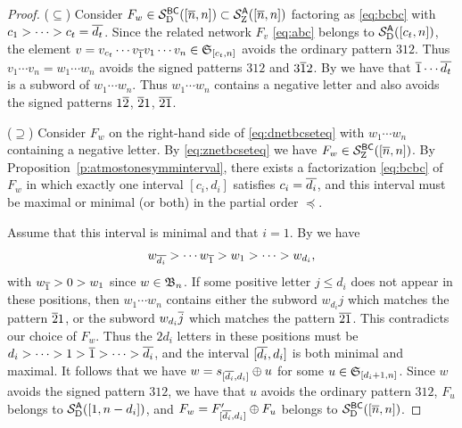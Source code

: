 \documentclass[11pt]{article}
\theoremstyle{definition}
\numberwithin{equation}{section}
\begin{document}
\begin{proof}
  ($\subseteq$)
  Consider
  $F_w \in \mathcal S^{\mathsf{BC}}_{\mathrm D}([\overline{n}, n]) \subset \mathcal S^{\mathsf{A}}_{\mathrm Z}([\overline{n}, n])$
  factoring as
  \eqref{eq:bcbc}
  with $c_1 > \cdots > c_t = \overline{d_t}$.
  Since the related network $F_v$ \eqref{eq:abc}
  belongs to
  $\mathcal S^{\mathsf{A}}_{\mathrm D}([c_t, n])$,
  the element $v = v_{c_t} \cdots v_{\overline{1}} v_1 \cdots v_n \in \mathfrak{S}_{[c_t,n]}$
  avoids the ordinary pattern $312$.
  Thus $v_1 \cdots v_n = w_1 \cdots w_n$
  avoids the signed patterns $312$ and $3 \overline{1} 2$.
  By \cite[Obs.\,3.2]{SkanNNDCB}
  we have that
  $\overline{1} \cdots \overline{d_t}$ is a subword of $w_1 \cdots w_n$.
  Thus $w_1 \cdots w_n$ contains a negative letter and also
  avoids the signed patterns $1 \overline{2}$, $\overline{2}1$, $\overline{2}\overline{1}$. 
  
  ($\supseteq$) Consider $F_w$ on the right-hand side of
  \eqref{eq:dnetbcseteq} with $w_1 \cdots w_n$ containing a negative
  letter.
  By \eqref{eq:znetbcseteq}
  we have
  $F_w \in \mathcal S^{\mathsf{BC}}_{\mathrm Z}([\overline{n},n])$.
  By Proposition~\ref{p:atmostonesymminterval},
  there exists a factorization
  \eqref{eq:bcbc} of $F_w$
  in which exactly one interval $[c_i,d_i]$ satisfies $c_i = \overline{d_i}$,
  and this interval must be maximal or minimal (or both)
  in the partial order $\preceq$.

  Assume that this interval is minimal and that $i = 1$.
  By \cite[Obs.\,3.2]{SkanNNDCB}
  we have
  \begin{equation}\label{eq:decseq}
    w_{\ol{d_i}} > \cdots w_{\ol1} > w_1 > \cdots > w_{d_i},
  \end{equation}
  with $w_{\overline{1}} > 0 > w_1$ since $w \in \mathfrak{B}_n$.
  If some positive letter $j \leq d_i$ does not appear in these positions,
  then $w_1 \cdots w_n$ contains either
  the subword $w_{d_i} j$ which matches the pattern $\overline{2}1$,
  or the subword $w_{d_i} \overline{j}$ which matches the pattern $\overline{2}\overline{1}$.
  This contradicts our choice of $F_w$.
  Thus
  the $2d_i$ letters in these positions
  must be
  $d_i > \cdots > 1 > \overline{1} > \cdots > \overline{d_i}$,
  and the interval $[\overline{d_i},d_i]$ is both minimal and maximal.
  It follows that we have $w = s_{[\overline{d_i},d_i]} \oplus u$ for some
  $u \in \mathfrak{S}_{[d_i+1,n]}$.
  Since $w$ avoids the signed pattern $312$, we have that
  $u$ avoids the ordinary pattern $312$,
  $F_u$ belongs to $\mathcal S^{\mathsf{A}}_{\mathrm D}([1,n-d_i])$,
  and $F_w = F'_{[\overline{d_i},d_i]} \oplus F_u$ belongs to $\mathcal S^{\mathsf{BC}}_{\mathrm D}([\overline{n},n])$.


\end{proof}
\end{document}
